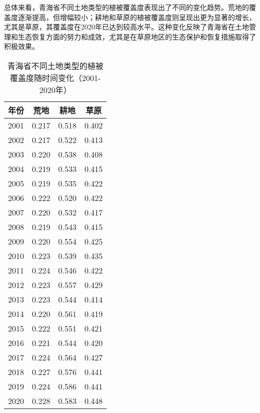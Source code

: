 \documentclass{article}
\begin{document}
		总体来看，青海省不同土地类型的植被覆盖度表现出了不同的变化趋势。荒地的覆盖度逐渐提高，但增幅较小；耕地和草原的植被覆盖度则呈现出更为显著的增长，尤其是草原，其覆盖度在2020年已达到较高水平。这种变化反映了青海省在土地管理和生态恢复方面的努力和成效，尤其是在草原地区的生态保护和恢复措施取得了积极效果。
				
		
			
		\begin{table}[H]
			\centering
			\begin{tabular}{|c|c|c|c|}
				\hline
				\textbf{年份} & \textbf{荒地} & \textbf{耕地} & \textbf{草原} \\
				\hline
				2001 & 0.217 & 0.518 & 0.402 \\
				2002 & 0.217 & 0.522 & 0.413 \\
				2003 & 0.220 & 0.538 & 0.408 \\
				2004 & 0.219 & 0.533 & 0.415 \\
				2005 & 0.219 & 0.535 & 0.422 \\
				2006 & 0.222 & 0.520 & 0.422 \\
				2007 & 0.220 & 0.532 & 0.417 \\
				2008 & 0.219 & 0.543 & 0.415 \\
				2009 & 0.220 & 0.554 & 0.425 \\
				2010 & 0.223 & 0.539 & 0.435 \\
				2011 & 0.224 & 0.546 & 0.422 \\
				2012 & 0.223 & 0.557 & 0.429 \\
				2013 & 0.223 & 0.544 & 0.414 \\
				2014 & 0.220 & 0.561 & 0.419 \\
				2015 & 0.222 & 0.551 & 0.421 \\
				2016 & 0.221 & 0.544 & 0.420 \\
				2017 & 0.224 & 0.564 & 0.427 \\
				2018 & 0.227 & 0.576 & 0.441 \\
				2019 & 0.224 & 0.586 & 0.441 \\
				2020 & 0.228 & 0.583 & 0.448 \\
				\hline
			\end{tabular}
			\caption{青海省不同土地类型的植被覆盖度随时间变化（2001-2020年）}
		\end{table}
		
\end{document}
